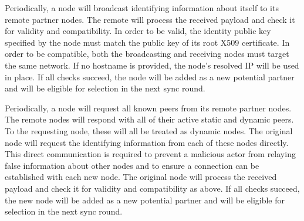 Periodically, a node will broadcast identifying information about itself to its remote partner nodes.
The remote will process the received payload and check it for validity and compatibility.
In order to be valid, the identity public key specified by the node must match the public key of its root X509 certificate.
In order to be compatible, both the broadcasting and receiving nodes must target the same network.
If no hostname is provided, the node's resolved IP will be used in place.
If all checks succeed, the node will be added as a new potential partner and will be eligible for selection in the next sync round.

Periodically, a node will request all known peers from its remote partner nodes.
The remote nodes will respond with all of their active static and dynamic peers.
To the requesting node, these will all be treated as dynamic nodes.
The original node will request the identifying information from each of these nodes directly.
This direct communication is required to prevent a malicious actor from relaying false information about other nodes and to ensure a connection can be established with each new node.
The original node will process the received payload and check it for validity and compatibility as above.
If all checks succeed, the new node will be added as a new potential partner and will be eligible for selection in the next sync round.

